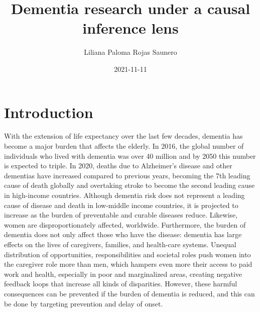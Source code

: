 \documentclass[
]{book}
\title{Dementia research under a causal inference lens}
\author{Liliana Paloma Rojas Saunero}
\date{2021-11-11}
\begin{document}
\maketitle

{
\setcounter{tocdepth}{1}
\tableofcontents
}
\hypertarget{intro}{%
\chapter{Introduction}\label{intro}}

With the extension of life expectancy over the last few decades, dementia has become a major burden that affects the elderly. In 2016, the global number of individuals who lived with dementia was over 40 million\autocite{gbd2016} and by 2050 this number is expected to triple\autocite{worldreport2018}. In 2020, deaths due to Alzheimer's disease and other dementias have increased compared to previous years, becoming the 7th leading cause of death globally and overtaking stroke to become the second leading cause in high-income countries. Although dementia risk does not represent a leading cause of disease and death in low-middle income countries, it is projected to increase as the burden of preventable and curable diseases reduce\autocite{who2020}. Likewise, women are disproportionately affected, worldwide\autocite{women2015}. Furthermore, the burden of dementia does not only affect those who have the disease: dementia has large effects on the lives of caregivers, families, and health-care systems. Unequal distribution of opportunities, responsibilities and societal roles push women into the caregiver role more than men, which hampers even more their access to paid work and health, especially in poor and marginalized areas, creating negative feedback loops that increase all kinds of disparities\autocite{swinkels2019,brodaty2009,etters2008}. However, these harmful consequences can be prevented if the burden of dementia is reduced, and this can be done by targeting prevention and delay of onset\autocite{carrillo2013}.
\end{document}
